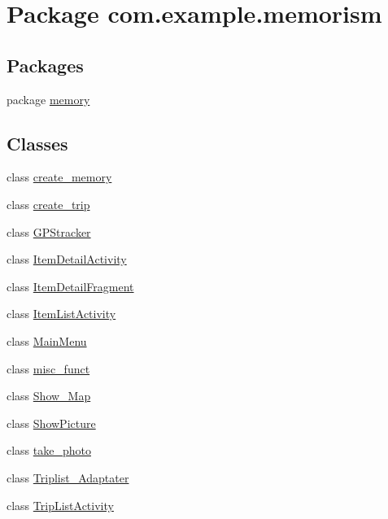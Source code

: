 \hypertarget{namespacecom_1_1example_1_1memorism}{}\section{Package com.\+example.\+memorism}
\label{namespacecom_1_1example_1_1memorism}
\subsection*{Packages}
\begin{DoxyCompactItemize}
\item 
package \hyperlink{namespacecom_1_1example_1_1memorism_1_1memory}{memory}
\end{DoxyCompactItemize}
\subsection*{Classes}
\begin{DoxyCompactItemize}
\item 
class \hyperlink{classcom_1_1example_1_1memorism_1_1create__memory}{create\+\_\+memory}
\item 
class \hyperlink{classcom_1_1example_1_1memorism_1_1create__trip}{create\+\_\+trip}
\item 
class \hyperlink{classcom_1_1example_1_1memorism_1_1_g_p_stracker}{G\+P\+Stracker}
\item 
class \hyperlink{classcom_1_1example_1_1memorism_1_1_item_detail_activity}{Item\+Detail\+Activity}
\item 
class \hyperlink{classcom_1_1example_1_1memorism_1_1_item_detail_fragment}{Item\+Detail\+Fragment}
\item 
class \hyperlink{classcom_1_1example_1_1memorism_1_1_item_list_activity}{Item\+List\+Activity}
\item 
class \hyperlink{classcom_1_1example_1_1memorism_1_1_main_menu}{Main\+Menu}
\item 
class \hyperlink{classcom_1_1example_1_1memorism_1_1misc__funct}{misc\+\_\+funct}
\item 
class \hyperlink{classcom_1_1example_1_1memorism_1_1_show___map}{Show\+\_\+\+Map}
\item 
class \hyperlink{classcom_1_1example_1_1memorism_1_1_show_picture}{Show\+Picture}
\item 
class \hyperlink{classcom_1_1example_1_1memorism_1_1take__photo}{take\+\_\+photo}
\item 
class \hyperlink{classcom_1_1example_1_1memorism_1_1_triplist___adaptater}{Triplist\+\_\+\+Adaptater}
\item 
class \hyperlink{classcom_1_1example_1_1memorism_1_1_trip_list_activity}{Trip\+List\+Activity}
\end{DoxyCompactItemize}

